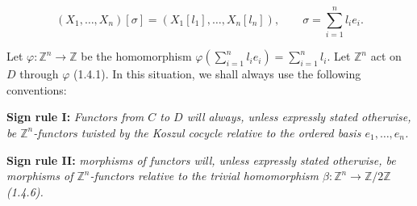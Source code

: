 \begin{equation}
  (X_1,\ldots,X_n)[\sigma]
  =(X_1[l_1],\ldots,X_n[l_n]),
  \qquad
  \sigma=\sum_{i=1}^{n}l_i e_i.
  \tag{1.6.6.1}
\end{equation}

Let $\varphi\colon\mathbb Z^n\longrightarrow\mathbb Z$ be the
homomorphism
$\varphi(\sum_{i=1}^{n}l_i e_i)=\sum_{i=1}^{n}l_i$.
Let $\mathbb Z^n$ act on $D$ through $\varphi$ (1.4.1). In this
situation, we shall always use the following conventions:

\noindent\textbf{Sign rule I:}
\emph{Functors from $C$ to $D$ will always, unless expressly stated
otherwise, be $\mathbb Z^n$-functors twisted by the Koszul cocycle
relative to the ordered basis $e_1,\ldots,e_n$.}

\noindent\textbf{Sign rule II:}
\emph{morphisms of functors will, unless expressly stated otherwise,
be morphisms of $\mathbb Z^n$-functors relative to the trivial
homomorphism
$\beta\colon\mathbb Z^n\longrightarrow\mathbb Z/2\mathbb Z$ (1.4.6).}
